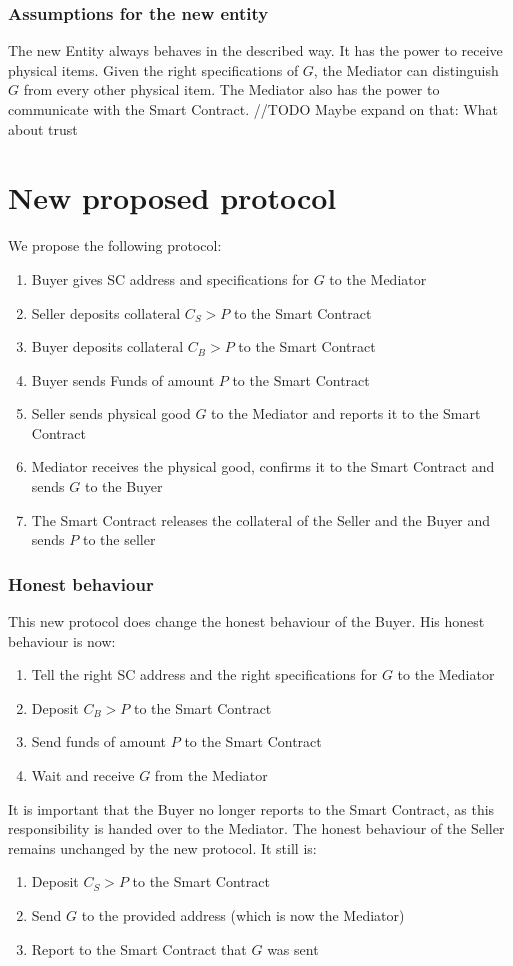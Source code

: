 \documentclass{cacthesis}
\begin{document}
\subsubsection{Assumptions for the new entity}
The new Entity always behaves in the described way. It has the power to receive physical items. Given the right specifications of $G$, the Mediator can distinguish $G$ from every other  physical item. The Mediator also has the power to communicate with the Smart Contract. 
//TODO Maybe expand on that: What about trust
\section{New proposed protocol}
We propose the following protocol:
\begin{enumerate}
    \item Buyer gives SC address and specifications for $G$ to the Mediator
    \item Seller deposits collateral $C_S > P$ to the Smart Contract
    \item Buyer deposits collateral $C_B > P$ to the Smart Contract
    \item Buyer sends Funds of amount $P$ to the Smart Contract
    \item Seller sends physical good $G$ to the Mediator and reports it to the Smart Contract
    \item Mediator receives the physical good, confirms it to the Smart Contract and sends $G$ to the Buyer
    \item The Smart Contract releases the collateral of the Seller and the Buyer and sends $P$ to the seller
\end{enumerate}
\subsubsection{Honest behaviour}
This new protocol does change the honest behaviour of the Buyer. His honest behaviour is now:
\begin{enumerate}
    \item Tell the right SC address and the right specifications for $G$ to the Mediator
    \item Deposit $C_B>P$ to the Smart Contract
    \item Send funds of amount $P$ to the Smart Contract
    \item Wait and receive $G$ from the Mediator
\end{enumerate}
It is important that the Buyer no longer reports to the Smart Contract, as this responsibility is handed over to the Mediator.\newline
The honest behaviour of the Seller remains unchanged by the new protocol. It still is:
\begin{enumerate}
    \item Deposit $C_S>P$ to the Smart Contract
    \item Send $G$ to the provided address (which is now the Mediator)
    \item Report to the Smart Contract  that $G$ was sent
\end{enumerate}
\end{document}

